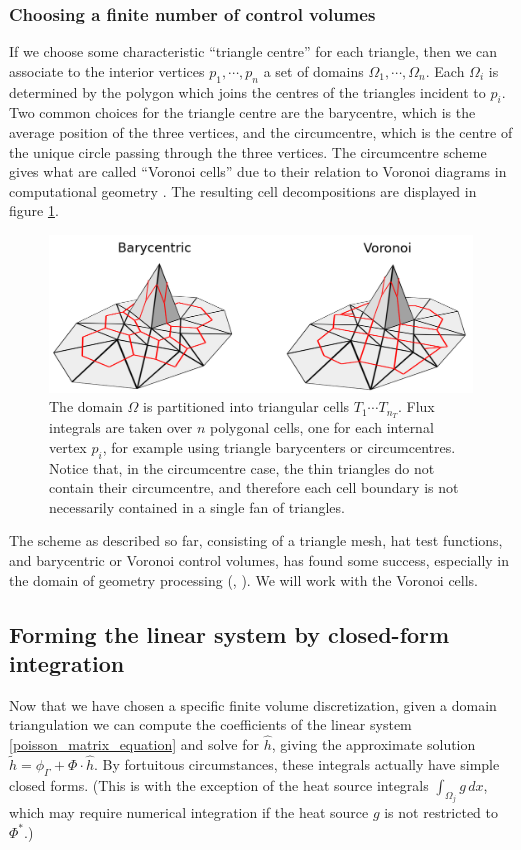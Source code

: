 \subsubsection{Choosing a finite number of control volumes}
If we choose some characteristic ``triangle centre'' for each triangle, then we can associate to the interior vertices
$p_1,\cdots,p_n$ a set of domains $\Omega_1,\cdots,\Omega_n$. Each $\Omega_i$ is determined by the polygon which joins the centres of the triangles
incident to $p_i$.
Two common choices for the triangle centre are the barycentre, which is the average position of the three vertices, and the circumcentre,
which is the centre of the unique circle passing through the three vertices. The circumcentre scheme gives what are called
``Voronoi cells'' due to their relation to Voronoi diagrams in computational geometry \cite{orourke}.
The resulting cell decompositions are displayed in figure
\ref{cell_decompositions}.

\begin{figure}[H]
    \begin{center}
        \includegraphics[width=0.7\linewidth]{figures/cell.png}
    \end{center}
    \caption{\scriptsize
        The domain $\Omega$ is partitioned into triangular cells $T_1\cdots T_{n_T}$.
        Flux integrals are taken over $n$ polygonal cells, one for each internal vertex $p_i$, for example using triangle barycenters or circumcentres.
        Notice that, in the circumcentre case, the thin triangles do not contain their circumcentre, and therefore each cell boundary is not necessarily
        contained in a single fan of triangles.
    }
    \label{cell_decompositions}
\end{figure}

The scheme as described so far, consisting of a triangle mesh, hat test functions, and barycentric or Voronoi control volumes,
has found some success, especially in the domain of geometry processing (\cite{polygon_mesh_processing}, \cite{ddg_triangulated}).
We will work with the Voronoi cells.

\subsection{Forming the linear system by closed-form integration}
Now that we have chosen a specific finite volume discretization, given a domain triangulation we can compute
the coefficients of the linear system \eqref{poisson_matrix_equation} and solve for $\hat{h}$, giving
the approximate solution $\tilde{h} = \phi_\Gamma + \Phi\cdot \hat{h}$.
By fortuitous circumstances, these integrals actually have simple closed forms.
(This is with the exception of the heat source integrals $\int_{\Omega_j}g\,dx$,
which may require numerical integration if the heat source $g$ is not restricted to $\Phi^*$.)


